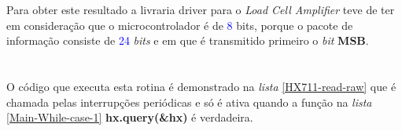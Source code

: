 Para obter este resultado a livraria driver para o \textit{Load Cell Amplifier} teve de ter em consideração que o microcontrolador é de \textcolor{blue}{8} bits, porque o pacote de informação consiste de \textcolor{blue}{24} \textit{bits} e em que é transmitido primeiro o \textit{bit} \textbf{MSB}.
\\
\\
\\
O código que executa esta rotina é demonstrado na \textit{lista} \ref{HX711-read-raw} que é chamada pelas interrupções periódicas e só é ativa quando a função na \textit{lista} \ref{Main-While-case-1} \textbf{hx.query(\&hx)} é verdadeira.
\\
\\
{ \tiny
	
}
\newpage
{ \tiny
	
}
